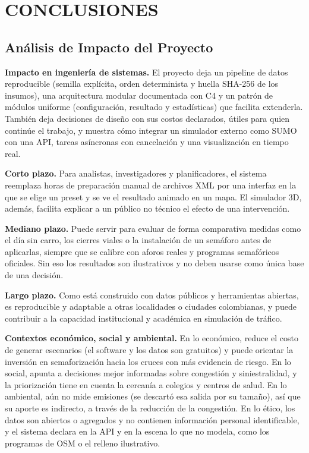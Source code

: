  \setcounter{subsection}{0}

\section{CONCLUSIONES}

\subsection{Análisis de Impacto del Proyecto}

\textbf{Impacto en ingeniería de sistemas.} El proyecto deja un pipeline de datos reproducible (semilla explícita, orden determinista y huella SHA-256 de los insumos), una arquitectura modular documentada con C4 y un patrón de módulos uniforme (configuración, resultado y estadísticas) que facilita extenderla. También deja decisiones de diseño con sus costos declarados, útiles para quien continúe el trabajo, y muestra cómo integrar un simulador externo como SUMO con una API, tareas asíncronas con cancelación y una visualización en tiempo real.

\textbf{Corto plazo.} Para analistas, investigadores y planificadores, el sistema reemplaza horas de preparación manual de archivos XML por una interfaz en la que se elige un preset y se ve el resultado animado en un mapa. El simulador 3D, además, facilita explicar a un público no técnico el efecto de una intervención.

\textbf{Mediano plazo.} Puede servir para evaluar de forma comparativa medidas como el día sin carro, los cierres viales o la instalación de un semáforo antes de aplicarlas, siempre que se calibre con aforos reales y programas semafóricos oficiales. Sin eso los resultados son ilustrativos y no deben usarse como única base de una decisión.

\textbf{Largo plazo.} Como está construido con datos públicos y herramientas abiertas, es reproducible y adaptable a otras localidades o ciudades colombianas, y puede contribuir a la capacidad institucional y académica en simulación de tráfico.

\textbf{Contextos económico, social y ambiental.} En lo económico, reduce el costo de generar escenarios (el software y los datos son gratuitos) y puede orientar la inversión en semaforización hacia los cruces con más evidencia de riesgo. En lo social, apunta a decisiones mejor informadas sobre congestión y siniestralidad, y la priorización tiene en cuenta la cercanía a colegios y centros de salud. En lo ambiental, aún no mide emisiones (se descartó esa salida por su tamaño), así que su aporte es indirecto, a través de la reducción de la congestión. En lo ético, los datos son abiertos o agregados y no contienen información personal identificable, y el sistema declara en la API y en la escena lo que no modela, como los programas de OSM o el relleno ilustrativo.

